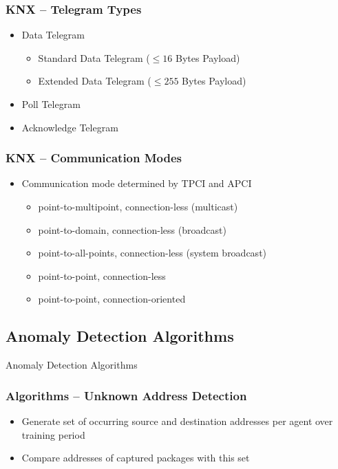 \begin{frame}[c]
\frametitle{KNX -- Telegram Types}
	\begin{itemize}
		\item Data Telegram
		\begin{itemize}
			\item Standard Data Telegram ($\leq 16$ Bytes Payload)
			\item Extended Data Telegram ($\leq 255$ Bytes Payload)
		\end{itemize}
		\item Poll Telegram
		\item Acknowledge Telegram
	\end{itemize}
	
	\note{
		
	}
\end{frame}

\begin{frame}[c]
	\frametitle{KNX -- Communication Modes}
	\begin{itemize}
	\item Communication mode determined by TPCI and APCI
	\begin{itemize}
		\item point-to-multipoint, connection-less (multicast)
		\item point-to-domain, connection-less (broadcast)
		\item point-to-all-points, connection-less (system broadcast)
		\item point-to-point, connection-less
		\item point-to-point, connection-oriented
	\end{itemize}
	
	\end{itemize}
	
\end{frame}

\subsection{Anomaly Detection Algorithms}
\begin{frame}[c]
	\centering
	\LARGE Anomaly Detection Algorithms
\end{frame}

\begin{frame}[c]
	\frametitle{Algorithms -- Unknown Address Detection}
	
	\begin{itemize}
		\item Generate set of occurring source and destination addresses per agent over training period
		\item Compare addresses of captured packages with this set
	\end{itemize}
\end{frame}

